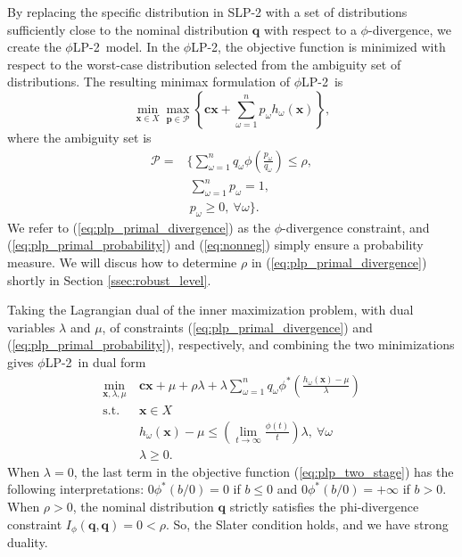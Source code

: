\documentclass[opre,nonblindrev]{informs3} %
\newcommand{\x}{\mathbf{x}}
\renewcommand{\c}{\mathbf{c}}
\newcommand{\q}{\mathbf{q}}
\newcommand{\p}{\mathbf{p}}
\newcommand{\st}{\mbox{s.t.}}
\newcommand{\plp}{$\phi$LP-2}
\begin{document}
By replacing the specific distribution in SLP-2 with a set of distributions sufficiently close to the nominal distribution $\q$ with respect to a $\phi$-divergence, we create the \plp\ model.
In the \plp, the objective function is minimized with respect to the worst-case distribution selected from the ambiguity set of distributions.
The resulting minimax formulation of \plp\ is
\begin{equation}
	\min_{\x \in X} \max_{\p \in \mathcal{P}} \left\{ \c\x + \sum_{\omega=1}^{n} p_\omega h_\omega(\x) \right\}, \label{eq:plp_primal}
\end{equation}
where the ambiguity set is
\begin{align}
	\mathcal{P} = & \Bigg\{ \sum_{\omega = 1}^{n} q_\omega \phi\left(\frac{p_\omega}{q_\omega}\right) \leq \rho, \label{eq:plp_primal_divergence} \\
	& \ \sum_{\omega=1}^{n} p_\omega = 1, \label{eq:plp_primal_probability} \\
	& \  p_\omega \geq 0,\ \forall \omega \Bigg\}. \label{eq:nonneg}
\end{align}
We refer to (\ref{eq:plp_primal_divergence}) as the $\phi$-divergence constraint, and (\ref{eq:plp_primal_probability}) and (\ref{eq:nonneg}) simply ensure a probability measure.
We will discus how to determine $\rho$ in (\ref{eq:plp_primal_divergence}) shortly in Section \ref{ssec:robust_level}.

Taking the Lagrangian dual of the inner maximization problem, with dual variables $\lambda$ and $\mu$, of constraints (\ref{eq:plp_primal_divergence}) and (\ref{eq:plp_primal_probability}), respectively, and combining the two minimizations gives \plp\ in dual form
\begin{align}
	\min_{\x,\lambda,\mu} \ & \c\x + \mu + \rho \lambda + \lambda \sum_{\omega=1}^{n} q_\omega \phi^*\left(\frac{h_\omega(\x) - \mu}{\lambda}\right) \label{eq:plp_two_stage} \\
	\st \ & \x \in X \nonumber \\
	& h_\omega(\x) - \mu \leq \left( \lim_{t \rightarrow \infty} \frac{\phi(t)}{t} \right) \lambda, \ \forall \omega \label{eq:plp_feas_constraint}\\
	& \lambda \geq 0. \nonumber
\end{align}
When $\lambda =0$, the last term in the objective function (\ref{eq:plp_two_stage}) has the following interpretations: $0\phi^*(b/0)=0$ if $b\leq 0$ and  $0\phi^*(b/0)=+\infty$ if $b > 0$.
When $\rho>0$, the nominal distribution $\q$ strictly satisfies the phi-divergence constraint $I_{\phi}(\q,\q)=0<\rho$. 
So, the Slater condition holds, and we have strong duality.
\end{document}
